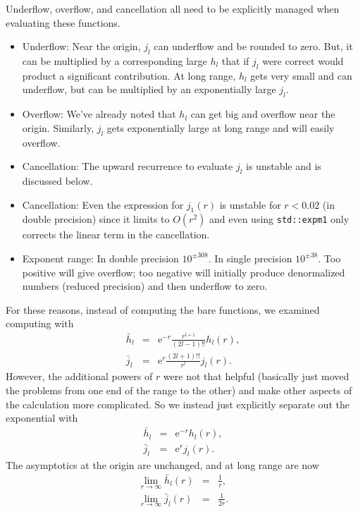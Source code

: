 \documentclass[12pt]{article}
\begin{document}
Underflow, overflow, and cancellation all need to be explicitly managed when evaluating these functions.
\begin{itemize}
\item  Underflow: Near the origin, $j_l$ can underflow and be rounded to zero.  But, it can be multiplied by a corresponding large $h_l$ that if $j_l$ were correct would product a significant contribution.  At long range, $h_l$ gets very small and can underflow, but can be multiplied by an exponentially large $j_l$.
\item Overflow: We've already noted that $h_l$ can get big and overflow near the origin.  Similarly, $j_l$ gets exponentially large at long range and will easily overflow.
\item Cancellation: The upward recurrence to evaluate $j_l$ is unstable and is discussed below.
\item Cancellation: Even the expression for $j_1(r)$ is unstable for $r<0.02$ (in double precision) since it limits to $O(r^2)$ and even using \verb+std::expm1+ only corrects the linear term in the cancellation.
\item Exponent range: In double precision $10^{\pm 308}$.  In single precision $10^{\pm 38}$.  Too positive will give overflow; too negative will initially produce denormalized numbers (reduced precision) and then underflow to zero.
\end{itemize}

For these reasons, instead of computing the bare functions, we examined computing with
\begin{eqnarray*}
  \bar{h}_l & = & {\mathrm e}^{-r} \frac{r^{l+1}}{(2l-1)!!} h_l(r) ,\\
  \bar{j}_l & = & {\mathrm e}^{r} \frac{(2l+1)!!}{r^l} j_l(r).
\end{eqnarray*}
However, the additional powers of $r$ were not that helpful (basically just moved the problems from one end of the range to the other) and make other aspects of the calculation more complicated.  So we instead just explicitly separate out the exponential with
\begin{eqnarray}
  \bar{h}_l & = & {\mathrm e}^{-r} h_l(r) , \\
  \bar{j}_l & = & {\mathrm e}^{r} j_l(r) .
\end{eqnarray}
The asymptotics at the origin are unchanged, and at long range are now
\begin{eqnarray}
  \lim_{r \rightarrow \infty} \bar{h}_l(r) & = & \frac{1}{r}, \\
  \lim_{r \rightarrow \infty} \bar{j}_l(r) & = & \frac{1}{2r} .
\end{eqnarray}
\end{document}
